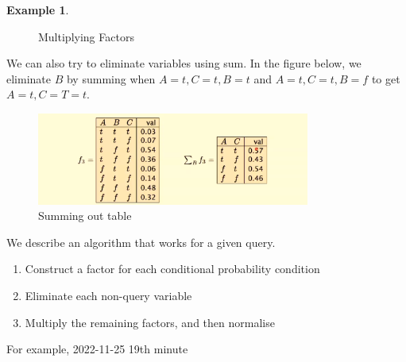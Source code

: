 \documentclass[a4paper]{article}
\theoremstyle{plain}
\theoremstyle{definition}
\newtheorem{exmp}{Example}[section]
\theoremstyle{remark}
\begin{document}
\begin{exmp}
\begin{figure}[H]
	\caption{Multiplying Factors}
	\label{fig:fac2-png}
\end{figure}
We can also try to eliminate variables using sum. In the figure below, we eliminate $B$ by summing when $A=t,C=t,B=t$ and $A=t,C=t,B=f$ to get $A=t,C=T=t$.
\begin{figure}[H]
	\centering
	\includegraphics[width=0.8\textwidth]{sum.png}
	\caption{Summing out table}
	\label{fig:sum-png}
\end{figure}
We describe an algorithm that works for a given query.
\begin{enumerate}
	\item Construct a factor for each conditional probability condition
	\item Eliminate each non-query variable
	\item Multiply the remaining factors, and then normalise
\end{enumerate}
For example, 2022-11-25 19th minute
\end{exmp}
\end{document}
